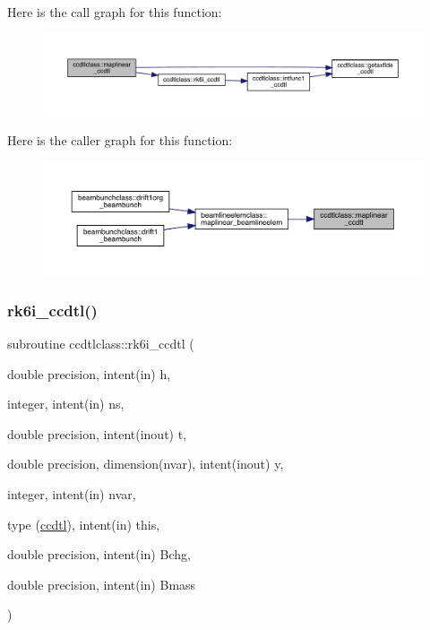 Here is the call graph for this function\+:\nopagebreak
\begin{figure}[H]
\begin{center}
\leavevmode
\includegraphics[width=350pt]{namespaceccdtlclass_a520796b320588e1f31ce8587301b571b_cgraph}
\end{center}
\end{figure}
Here is the caller graph for this function\+:\nopagebreak
\begin{figure}[H]
\begin{center}
\leavevmode
\includegraphics[width=350pt]{namespaceccdtlclass_a520796b320588e1f31ce8587301b571b_icgraph}
\end{center}
\end{figure}
\mbox{\label{namespaceccdtlclass_aca1c6ac6cdbd554820ab2c213a987647}} 
\subsubsection{\texorpdfstring{rk6i\_ccdtl()}{rk6i\_ccdtl()}}
{\footnotesize\ttfamily subroutine ccdtlclass\+::rk6i\+\_\+ccdtl (\begin{DoxyParamCaption}\item[{double precision, intent(in)}]{h,  }\item[{integer, intent(in)}]{ns,  }\item[{double precision, intent(inout)}]{t,  }\item[{double precision, dimension(nvar), intent(inout)}]{y,  }\item[{integer, intent(in)}]{nvar,  }\item[{type (\mbox{\hyperlink{namespaceccdtlclass_structccdtlclass_1_1ccdtl}{ccdtl}}), intent(in)}]{this,  }\item[{double precision, intent(in)}]{Bchg,  }\item[{double precision, intent(in)}]{Bmass }\end{DoxyParamCaption})}

